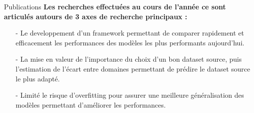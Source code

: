 \begin{subsectionframemod}{Publications}
    \textbf{Les recherches effectuées au cours de l'année ce sont articulés autours de 3 axes de recherche principaux :}
    \begin{itemize}
        \item[-] Le developpement d'un framework permettant de comparer rapidement et efficacement les performances des modèles les plus performants aujourd'hui.
        \item[-] La mise en valeur de l'importance du choix d'un bon dataset source, puis l'estimation de l'écart entre domaines permettant de prédire le dataset source le plus adapté.
        \item[-] Limité le risque d'overfitting pour assurer une meilleure généralisation des modèles permettant d'améliorer les performances.
    \end{itemize}

\end{subsectionframemod}

